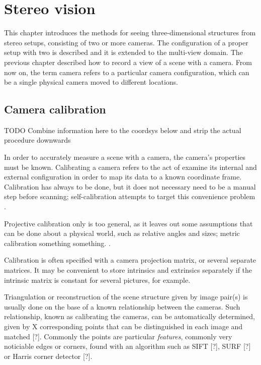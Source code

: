 \section{Stereo vision}

This chapter introduces the methods for seeing three-dimensional structures from stereo setups, consisting of two or more cameras.
The configuration of a proper setup with two is described and it is extended to the multi-view domain.
The previous chapter described how to record a view of a scene with a camera. From now on, the term camera refers to a particular camera configuration, which can be a single physical camera moved to different locations.

\subsection{Camera calibration}

TODO Combine information here to the coordsys below and strip the actual procedure downwards

In order to accurately measure a scene with a camera, the camera's properties must be known. Calibrating a camera refers to the act of examine its internal and external configuration in order to map its data to a known coordinate frame.
Calibration has always to be done, but it does not necessary need to be a manual step before scanning; self-calibration attempts to target this convenience problem \cite{pollefeys1999handheld, ETC}.

Projective calibration only is too general, as it leaves out some assumptions that can be done about a physical world, such as relative angles and sizes; metric calibration something something. \cite{zisserman1999metric}.

Calibration is often specified with a camera projection matrix, or several separate matrices.
It may be convenient to store intrinsics and extrinsics separately if the intrinsic matrix is constant for several pictures, for example.

Triangulation or reconstruction of the scene structure given by image pair(s) is usually done on the base of a known relationship between the cameras.
Such relationship, known as calibrating the cameras, can be automatically determined, given by X corresponding points that can be distinguished in each image and matched [?].
Commonly the points are particular \textit{features}, commonly very noticiable edges or corners, found with an algorithm such as SIFT [?], SURF [?] or Harris corner detector [?].

